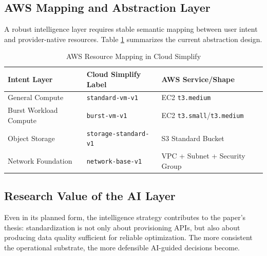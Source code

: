 \subsection{AWS Mapping and Abstraction Layer}
A robust intelligence layer requires stable semantic mapping between user intent and provider-native resources. Table \ref{tab:aws_mapping} summarizes the current abstraction design.

\begin{table}[h]
\centering
\caption{AWS Resource Mapping in Cloud Simplify}
\label{tab:aws_mapping}
\begin{tabular}{|l|l|l|}
\hline
\textbf{Intent Layer} & \textbf{Cloud Simplify Label} & \textbf{AWS Service/Shape} \\ \hline
General Compute & \texttt{standard-vm-v1} & EC2 \texttt{t3.medium} \\ \hline
Burst Workload Compute & \texttt{burst-vm-v1} & EC2 \texttt{t3.small}/\texttt{t3.medium} \\ \hline
Object Storage & \texttt{storage-standard-v1} & S3 Standard Bucket \\ \hline
Network Foundation & \texttt{network-base-v1} & VPC + Subnet + Security Group \\ \hline
\end{tabular}
\end{table}

\subsection{Research Value of the AI Layer}
Even in its planned form, the intelligence strategy contributes to the paper's thesis: standardization is not only about provisioning APIs, but also about producing data quality sufficient for reliable optimization. The more consistent the operational substrate, the more defensible AI-guided decisions become.
